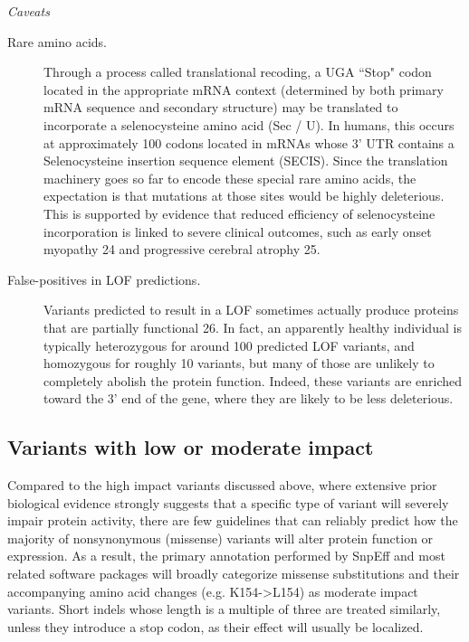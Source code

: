 	\textit{Caveats}
	
	\begin{description}
	
	\item[Rare amino acids.] Through a process called translational recoding, a UGA ``Stop" codon located in the appropriate mRNA context (determined by both primary mRNA sequence and secondary structure) may be translated to incorporate a selenocysteine amino acid (Sec / U). In humans, this occurs at approximately 100 codons located in mRNAs whose 3’ UTR contains a Selenocysteine insertion sequence element (SECIS). Since the translation machinery goes so far to encode these special rare amino acids, the expectation is that mutations at those sites would be highly deleterious. This is supported by evidence that reduced efficiency of selenocysteine incorporation is linked to severe clinical outcomes, such as early onset myopathy 24 and progressive cerebral atrophy 25.
	
	\item[False-positives in LOF predictions.] Variants predicted to result in a LOF sometimes actually produce proteins that are partially functional 26. In fact, an apparently healthy individual is typically heterozygous for around 100 predicted LOF variants, and homozygous for roughly 10 variants, but many of those are unlikely to completely abolish the protein function. Indeed, these variants are enriched toward the 3’ end of the gene, where they are likely to be less deleterious. 
	
	\end{description}

\subsection{Variants with low or moderate impact}

Compared to the high impact variants discussed above, where extensive prior biological evidence strongly suggests that a specific type of variant will severely impair protein activity, there are few guidelines that can reliably predict how the majority of nonsynonymous (missense) variants will alter protein function or expression. As a result, the primary annotation performed by SnpEff and most related software packages will broadly categorize missense substitutions and their accompanying amino acid changes (e.g. K154->L154) as moderate impact variants. Short indels whose length is a multiple of three are treated similarly, unless they introduce a stop codon, as their effect will usually be localized.

